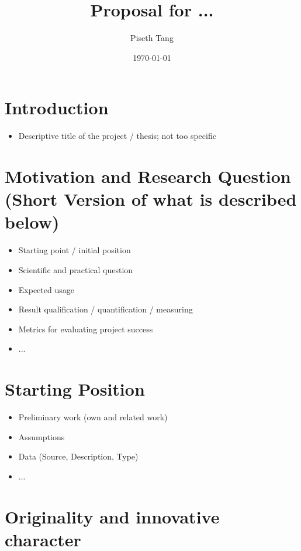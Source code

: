 \documentclass[11pt,a4paper]{article}
\begin{document}
\title{Proposal for ...}

\author{Piseth Tang}
\date{\today}
\maketitle


\section{Introduction}
\begin{itemize}
\item Descriptive title of the project / thesis; not too specific
\end{itemize}


\section{Motivation and Research Question (Short Version of what is described below)}

\begin{itemize}
\item Starting point / initial position
\item Scientific and practical question 
\item Expected usage
\item Result qualification / quantification / measuring
\item Metrics for evaluating project success
\item ...
\end{itemize}
	
\section{Starting Position}

\begin{itemize}
\item Preliminary work (own and related work)
\item Assumptions
\item Data (Source, Description, Type)
\item ...
\end{itemize}

\section{Originality and innovative character}
\end{document}
